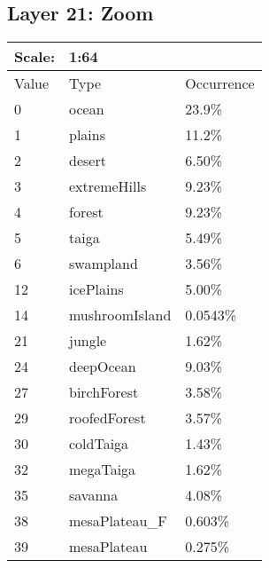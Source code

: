 \documentclass{article}
\begin{document}
	\subsection{Layer 21: Zoom}
	\begin{tabular}{|l|l|l|}\hline
		Scale: & \multicolumn{2}{|l|}{1:64} \\\hline\hline
		Value  & Type           & Occurrence \\\hline
		0      & ocean          & 23.9\%\\\hline
		1      & plains         & 11.2\%\\\hline
		2      & desert         & 6.50\%\\\hline
		3      & extremeHills   & 9.23\%\\\hline
		4      & forest         & 9.23\%\\\hline
		5      & taiga          & 5.49\%\\\hline
		6      & swampland      & 3.56\%\\\hline
		12     & icePlains      & 5.00\%\\\hline
		14     & mushroomIsland & 0.0543\%\\\hline
		21     & jungle         & 1.62\%\\\hline
		24     & deepOcean      & 9.03\%\\\hline
		27     & birchForest    & 3.58\%\\\hline
		29     & roofedForest   & 3.57\%\\\hline
		30     & coldTaiga      & 1.43\%\\\hline
		32     & megaTaiga      & 1.62\%\\\hline
		35     & savanna        & 4.08\%\\\hline
		38     & mesaPlateau\_F & 0.603\%\\\hline
		39     & mesaPlateau    & 0.275\%\\\hline
	\end{tabular}
\end{document}
